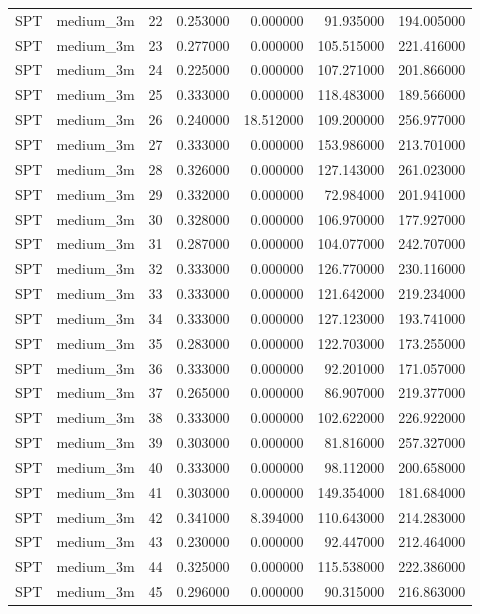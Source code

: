 \begin{tabular}{llrrrrr}
SPT & medium_3m & 22 & 0.253000 & 0.000000 & 91.935000 & 194.005000 \\
SPT & medium_3m & 23 & 0.277000 & 0.000000 & 105.515000 & 221.416000 \\
SPT & medium_3m & 24 & 0.225000 & 0.000000 & 107.271000 & 201.866000 \\
SPT & medium_3m & 25 & 0.333000 & 0.000000 & 118.483000 & 189.566000 \\
SPT & medium_3m & 26 & 0.240000 & 18.512000 & 109.200000 & 256.977000 \\
SPT & medium_3m & 27 & 0.333000 & 0.000000 & 153.986000 & 213.701000 \\
SPT & medium_3m & 28 & 0.326000 & 0.000000 & 127.143000 & 261.023000 \\
SPT & medium_3m & 29 & 0.332000 & 0.000000 & 72.984000 & 201.941000 \\
SPT & medium_3m & 30 & 0.328000 & 0.000000 & 106.970000 & 177.927000 \\
SPT & medium_3m & 31 & 0.287000 & 0.000000 & 104.077000 & 242.707000 \\
SPT & medium_3m & 32 & 0.333000 & 0.000000 & 126.770000 & 230.116000 \\
SPT & medium_3m & 33 & 0.333000 & 0.000000 & 121.642000 & 219.234000 \\
SPT & medium_3m & 34 & 0.333000 & 0.000000 & 127.123000 & 193.741000 \\
SPT & medium_3m & 35 & 0.283000 & 0.000000 & 122.703000 & 173.255000 \\
SPT & medium_3m & 36 & 0.333000 & 0.000000 & 92.201000 & 171.057000 \\
SPT & medium_3m & 37 & 0.265000 & 0.000000 & 86.907000 & 219.377000 \\
SPT & medium_3m & 38 & 0.333000 & 0.000000 & 102.622000 & 226.922000 \\
SPT & medium_3m & 39 & 0.303000 & 0.000000 & 81.816000 & 257.327000 \\
SPT & medium_3m & 40 & 0.333000 & 0.000000 & 98.112000 & 200.658000 \\
SPT & medium_3m & 41 & 0.303000 & 0.000000 & 149.354000 & 181.684000 \\
SPT & medium_3m & 42 & 0.341000 & 8.394000 & 110.643000 & 214.283000 \\
SPT & medium_3m & 43 & 0.230000 & 0.000000 & 92.447000 & 212.464000 \\
SPT & medium_3m & 44 & 0.325000 & 0.000000 & 115.538000 & 222.386000 \\
SPT & medium_3m & 45 & 0.296000 & 0.000000 & 90.315000 & 216.863000 \\

\end{tabular}
